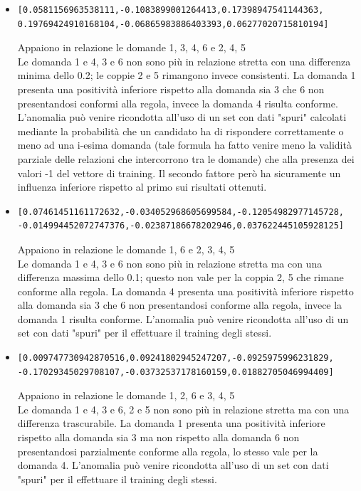\documentclass[10pt,a4paper]{article}
\begin{document}
\begin{itemize}
\item  \begin{verbatim}[0.0581156963538111,-0.1083899001264413,0.17398947541144363,
0.19769424910168104,-0.06865983886403393,0.06277020715810194]\end{verbatim}
Appaiono in relazione le domande 1, 3, 4, 6 e 2, 4, 5\\
Le domanda 1 e 4, 3 e 6  non sono pi\`u in relazione stretta con una differenza minima dello 0.2; le coppie 2 e 5 rimangono invece consistenti. La domanda 1 presenta una positivit\`a inferiore rispetto alla domanda sia 3 che 6 non presentandosi conformi alla regola, invece la domanda 4 risulta conforme. L'anomalia pu\`o venire ricondotta all'uso di un set con dati "spuri" calcolati mediante la probabilit\`a che un candidato ha di rispondere correttamente o meno ad una i-esima domanda (tale formula ha fatto venire meno la validit\`a parziale delle relazioni che intercorrono tra le domande) che alla presenza dei valori -1 del vettore di training. Il secondo fattore per\`o ha sicuramente un influenza inferiore rispetto al primo sui risultati ottenuti.

\item  \begin{verbatim}[0.07461451161172632,-0.034052968605699584,-0.12054982977145728,
-0.014994452072747376,-0.02387186678202946,0.037622445105928125]\end{verbatim}
Appaiono in relazione le domande 1, 6 e 2, 3, 4, 5\\
Le domanda 1 e 4, 3 e 6 non sono pi\`u in relazione stretta ma con una differenza massima dello 0.1; questo non vale per la coppia 2, 5 che rimane conforme alla regola. La domanda 4 presenta una positivit\`a inferiore rispetto alla domanda sia 3 che 6 non presentandosi conforme alla regola, invece la domanda 1 risulta conforme. L'anomalia pu\`o venire ricondotta all'uso di un set con dati "spuri" per il effettuare il training degli stessi.

\item  \begin{verbatim}[0.009747730942870516,0.09241802945247207,-0.0925975996231829,
-0.17029345029708107,-0.03732537178160159,0.01882705046994409]\end{verbatim}
Appaiono in relazione le domande 1, 2, 6 e 3, 4, 5\\
Le domanda 1 e 4, 3 e 6, 2 e 5  non sono pi\`u in relazione stretta ma con una differenza trascurabile. La domanda 1 presenta una positivit\`a inferiore rispetto alla domanda sia 3 ma non rispetto alla domanda 6 non presentandosi parzialmente conforme alla regola, lo stesso vale per la domanda 4. L'anomalia pu\`o venire ricondotta all'uso di un set con dati "spuri" per il effettuare il training degli stessi.


\end{itemize}
\end{document}
